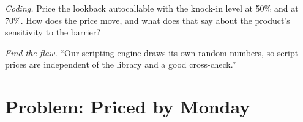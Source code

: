 \begin{exercise}[$\star\star\star$]\label{exo:pl:pricing-library-architecture:7}
\emph{Coding.} Price the lookback autocallable with the knock-in level at 50\% and at 70\%. How does the price move, and what does that say
about the product's sensitivity to the barrier?
\end{exercise}

\begin{exercise}[$\star\star\star$]\label{exo:pl:pricing-library-architecture:8}
\emph{Find the flaw.} ``Our scripting engine draws its own random numbers, so script prices are independent of the library and a good
cross-check.''
\end{exercise}

\section{Problem: Priced by Monday}

